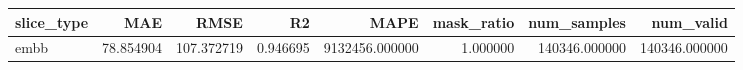 \begin{tabular}{lrrrrrrr}
\toprule
slice_type & MAE & RMSE & R2 & MAPE & mask_ratio & num_samples & num_valid \\
\midrule
embb & 78.854904 & 107.372719 & 0.946695 & 9132456.000000 & 1.000000 & 140346.000000 & 140346.000000 \\
\bottomrule
\end{tabular}
